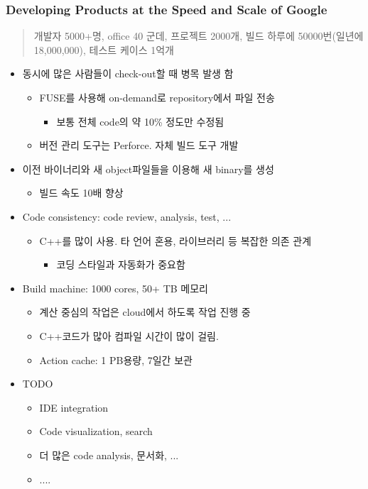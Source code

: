 \begin{frame}[allowframebreaks]
\frametitle{Developing Products at the Speed and Scale of Google}

\begin{quote}
개발자 5000+명, office 40 군데, 프로젝트 2000개, 빌드 하루에 50000번(일년에 18,000,000), 테스트 케이스 1억개
\end{quote}

\begin{itemize}
\item 동시에 많은 사람들이 check-out할 때 병목 발생 함
    \begin{itemize}
    \item FUSE를 사용해 on-demand로 repository에서 파일 전송 
         \begin{itemize}
         \item 보통 전체 code의 약  10\% 정도만 수정됨
         \end{itemize}
    \item 버전 관리 도구는 Perforce. 자체 빌드 도구 개발
    \end{itemize}
\item 이전 바이너리와 새 object파일들을 이용해 새 binary를 생성
    \begin{itemize}
    \item 빌드 속도 10배 향상
    \end{itemize}

\item Code consistency: code review, analysis, test, ...
    \begin{itemize}
    \item C++를 많이 사용. 타 언어 혼용, 라이브러리 등 복잡한 의존 관계
      \begin{itemize}
      \item 코딩 스타일과 자동화가 중요함
      \end{itemize}
    \end{itemize}

\item Build machine: 1000 cores, 50+ TB 메모리
    \begin{itemize}
    \item 계산 중심의 작업은 cloud에서 하도록 작업 진행 중
    \item C++코드가 많아 컴파일 시간이 많이 걸림.
    \item Action cache: 1 PB용량, 7일간 보관
    \end{itemize}

\pagebreak

\item TODO
    \begin{itemize}
    \item IDE integration 
    \item Code  visualization, search
    \item 더 많은 code analysis, 문서화, ...
    \item .... 
    \end{itemize}
\end{itemize}

\end{frame}
